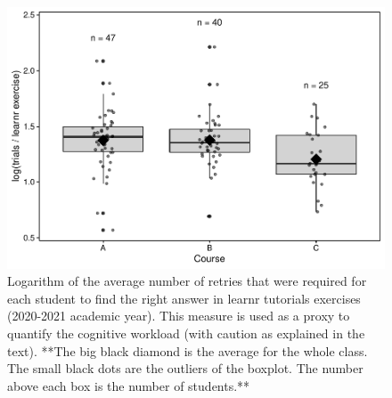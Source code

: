\documentclass{aims}
\theoremstyle{definition}
\begin{document}
\begin{figure}
\includegraphics[width=1\linewidth]{teaching_data_science_files/figure-latex/fig_learn_trials-1} \caption{\label{fig:fig_learn_trials} Logarithm of the average number of retries that were required for each student to find the right answer in learnr tutorials exercises (2020-2021 academic year). This measure is used as a proxy to quantify the cognitive workload (with caution as explained in the text). **The big black diamond is the average for the whole class. The small black dots are the outliers of the boxplot. The number above each box is the number of students.**}\label{fig:fig_learn_trials}
\end{figure}
\end{document}
